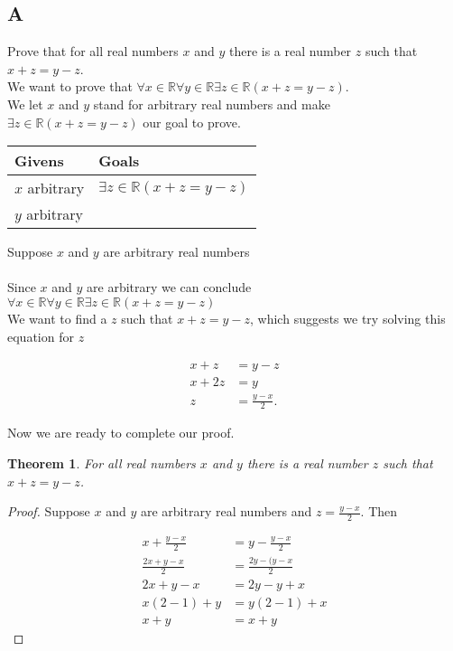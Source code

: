 \documentclass{article}
\newcommand{\n}{ \noindent }
\newtheorem*{theorem}{Theorem}  %
\begin{document}
\subsection*{A}
Prove that for all real numbers $x$ and $y$ there is a real number $z$ such that $x + z = y - z$. \\

\n We want to prove that $\forall x \in \mathbb{R} \forall y \in \mathbb{R} \exists z \in \mathbb{R}(x + z = y - z)$. \\

\n We let $x$ and $y$ stand for arbitrary real numbers and make $\exists z \in \mathbb{R}(x + z = y - z)$ our goal to prove.

\begin{table}[h]
\begin{tabular}{ll}
\hline
Givens & Goals   \\ \hline
$x$ arbitrary & $\exists z \in \mathbb{R}(x + z = y - z)$   \\ 
$y$ arbitrary & \\ \hline
\end{tabular}
\end{table}

\n Suppose $x$ and $y$ are arbitrary real numbers \\
\indent [proof of $\exists z \in \mathbb{R}(x + z = y - z)$ ] \\
\n Since $x$ and $y$ are arbitrary we can conclude $\forall x \in \mathbb{R} \forall y \in \mathbb{R} \exists z \in \mathbb{R}(x + z = y - z)$ \\

\n We want to find a $z$ such that $x + z = y - z$, which suggests we try solving this equation for $z$

\begin{align*}
x + z &= y - z \\
x + 2z &= y \\
z &= \frac{y - x}{2}.
\end{align*}

\n Now we are ready to complete our proof.

\begin{theorem} For all real numbers $x$ and $y$ there is a real number $z$ such that $x + z = y - z$.
\end{theorem}
\begin{proof}
Suppose $x$ and $y$ are arbitrary real numbers and $z = \tfrac{y - x}{2}$. Then

\begin{align*}
x + \frac{y - x}{2} &= y - \frac{y - x}{2} \\
\frac{2x + y - x}{2} &= \frac{2y - (y - x}{2} \\
2x + y - x &= 2y - y + x \\
x(2-1) + y &= y(2-1) + x\\
x + y &= x + y
\end{align*}
\end{proof}
\end{document}

